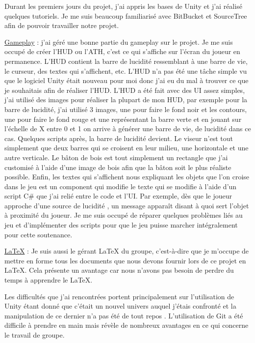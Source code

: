 \documentclass[a4paper]{article}
\begin{document}
Durant les premiers jours du projet, j'ai appris les bases de Unity et j'ai réalisé quelques tutoriels.
Je me suis beaucoup familiarisé avec BitBucket et SourceTree afin de pouvoir travailler notre projet.

\underline{Gameplay} : j'ai géré une bonne partie du gameplay sur le projet.
Je me suis occupé de créer l'HUD ou l'ATH, c'est ce qui s'affiche sur l'écran du joueur en permanence.
L'HUD contient la barre de lucidité ressemblant à une barre de vie, le curseur, des textes qui s'affichent, etc.
L'HUD n'a pas été une tâche simple vu que le logiciel Unity était nouveau pour moi donc j'ai eu du mal à trouver ce que je souhaitais afin de réaliser l'HUD.
L'HUD a été fait avec des UI assez simples, j'ai utilisé des images pour réaliser la plupart de mon HUD, par exemple pour la barre de lucidité, j'ai utilisé 3 images, une pour faire le fond noir et les contours, une pour faire le fond rouge et une représentant la barre verte et en jouant sur l'échelle de X entre 0 et 1 on arrive à générer une barre de vie, de lucidité dans ce cas. Quelques scripts après, la barre de lucidité devient.
Le viseur n'est tout simplement que deux barres qui se croisent en leur milieu, une horizontale et une autre verticale.
Le bâton de bois est tout simplement un rectangle que j'ai customisé à l'aide d'une image de bois afin que la bâton soit le plus réaliste possible.
Enfin, les textes qui s'affichent nous expliquant les objets que l'on croise dans le jeu est un component qui modifie le texte qui se modifie à l'aide d'un script C\# que j'ai relié entre le code et l'UI.
Par exemple, dès que le joueur approche d’une source de lucidité , un message apparaît disant à quoi sert l’objet à proximité du joueur.
Je me suis occupé de réparer quelques problèmes liés au jeu et d’implémenter des scripts pour que le jeu puisse marcher intégralement pour cette soutenance.

    \underline{LaTeX} : Je suis aussi le gérant LaTeX du groupe, c'est-à-dire que je m'occupe de mettre en forme tous les documents que nous devons fournir lors de ce projet en LaTeX. Cela présente un avantage car nous n'avons pas besoin de perdre du temps à apprendre le LaTeX.

Les difficultés que j’ai rencontrées portent principalement sur l’utilisation de Unity étant donné que c’était un nouvel univers auquel j’étais confronté et la manipulation de ce dernier n’a pas été de tout repos . L’utilisation de Git a été difficile à prendre en main mais révèle de nombreux avantages en ce qui concerne le travail de groupe. 
\end{document}
